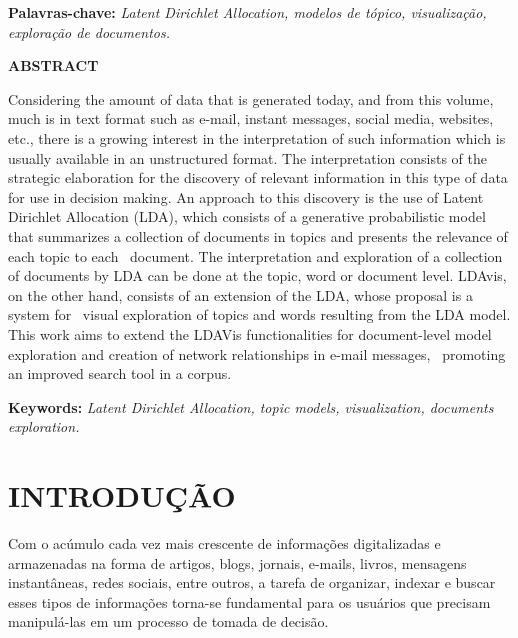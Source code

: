 \documentclass[12pt,a4paper]{article}
\begin{document}
 \begin{flushleft}
  {\bf Palavras-chave:} {\it Latent Dirichlet Allocation, modelos de tópico, visualização, exploração de documentos.}
  \end{flushleft}

\newpage
\thispagestyle{plain}
\begin{center}
\large
\textbf{ABSTRACT}
\end{center}
\renewcommand{\baselinestretch}{0.6666666}

Considering the amount of data that is generated today, and from this volume, much is in text format such as e-mail, instant messages, social media, websites, etc., there is a growing interest in the interpretation of such information which is usually available in an unstructured format. The interpretation consists of the strategic elaboration for the discovery of relevant information in this type of data for use in decision making. An approach to this discovery is the use of Latent Dirichlet Allocation (LDA), which consists of a generative probabilistic model that summarizes a collection of documents in topics and presents the relevance of each topic to each
 document. The interpretation and exploration of a collection of documents by LDA can be done at the topic, word or document level. LDAvis, on the other hand, consists of an extension of the LDA, whose proposal is a system for
 visual exploration of topics and words resulting from the LDA model. This work aims to extend the LDAVis functionalities for document-level model exploration and creation of network relationships in e-mail messages,
 promoting an improved search tool in a corpus.

\begin{flushleft}
{\bf Keywords:} {\it Latent Dirichlet Allocation, topic models, visualization, documents exploration.}
\end{flushleft}

\newpage
\thispagestyle{empty}
\tableofcontents

\newpage
\pagestyle{plain}
\renewcommand{\baselinestretch}{1.5}
\normalsize
\section{INTRODUÇÃO} \label{sec:introducao}
 
 Com o acúmulo cada vez mais crescente de informações digitalizadas e armazenadas na forma de artigos, blogs, jornais, e-mails, livros, mensagens instantâneas, redes sociais, entre outros, 
 a tarefa de organizar, indexar e buscar esses tipos de informações torna-se fundamental para os usuários que precisam manipulá-las em um processo de tomada de decisão. 
 
\end{document}
